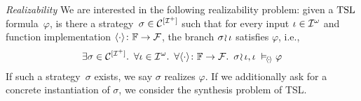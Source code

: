 \medskip

\noindent \textit{Realizability} We are interested in the following
realizability problem: given a $ \text{TSL} $ formula~$ \varphi $, is there
a strategy~$ \sigma \in \mathcal{C}^{[\mathcal{I}^{+}]} $ such that for every
input $ \iota \in \mathcal{I}^{\omega} $ and function implementation
$ \langle \cdot \rangle \colon \mathbb{F} \rightarrow \mathcal{F} $, the branch
$ \sigma \! \wr \hspace{-0.6pt} \iota $ satisfies $ \varphi $, i.e.,
%
\begin{equation*}
  \exists \sigma \in \mathcal{C}^{[\mathcal{I}^{+}]}. \ \, \forall \iota \in \mathcal{I}^{\hspace{0.2pt}\omega}. \ \, \forall \langle \cdot \rangle \colon
  \mathbb{F} \rightarrow \mathcal{F}. \ \, \sigma \! \wr \hspace{-0.6pt} \iota, \iota \;\vDash_{\!\langle \hspace{-1pt} \cdot \hspace{-1pt} \rangle} \varphi
\end{equation*}
%
If such a strategy~$ \sigma $ exists, we say $ \sigma $ realizes
$ \varphi $. If we additionally ask for a concrete instantiation of
$ \sigma $, we consider the synthesis problem of TSL.
